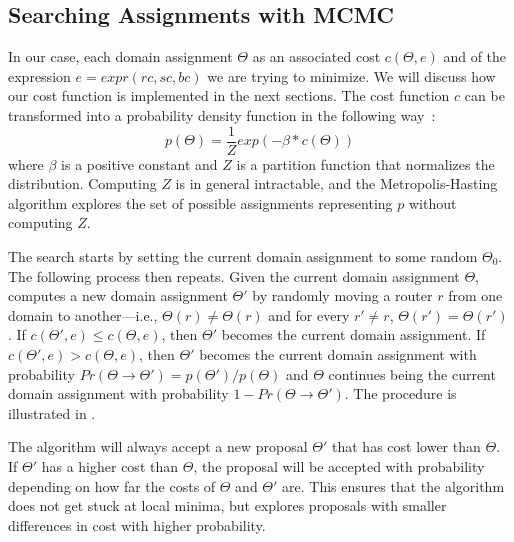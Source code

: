 \subsection{Searching Assignments with MCMC}

In our case, each domain assignment $\Theta$
as an associated cost $c(\Theta, e)$
and of the expression 
$e=expr(rc, sc, bc)$
we are trying to minimize.
We will discuss how our cost function is implemented in the next sections.
The cost function $c$ can be transformed 
into a probability density function in the following way~\cite{mcmcbook}:
\begin{equation}
	p(\Theta) = \frac{1}{Z}exp(-\beta * c(\Theta))
\end{equation}
where $\beta$ is a positive constant and $Z$ is a partition function  that
normalizes the distribution. Computing $Z$ is in general 
intractable, and the Metropolis-Hasting algorithm 
explores the set of possible assignments representing $p$ without computing $Z$. 

The search starts by setting the current domain assignment 
to some random $\Theta_0$.
The following process then repeats.
Given the current domain
assignment $\Theta$, 
computes a new domain assignment $\Theta'$ by randomly
moving a router $r$ from one domain to another---i.e., $\Theta(r)\neq \Theta(r)$ and
for every $r'\neq r$, $\Theta(r')= \Theta(r')$.
If $c(\Theta',e)\leq c(\Theta,e)$, then $\Theta'$ becomes the current domain assignment.
If $c(\Theta',e)>c(\Theta,e)$, then $\Theta'$ becomes the current domain assignment
with probability $Pr(\Theta \rightarrow \Theta')=p(\Theta')/p(\Theta)$ and 
 $\Theta$ continues being the current domain assignment with probability $1-Pr(\Theta \rightarrow \Theta')$.
The procedure is illustrated in .

The algorithm will always accept a new proposal $\Theta'$
that has cost lower than $\Theta$. If $\Theta'$ has a 
higher cost than $\Theta$, the proposal will be 
accepted with probability depending on 
how far the costs of $\Theta$ and $\Theta'$ are. This ensures that 
the algorithm does not get stuck at local minima, but 
explores proposals with smaller differences in cost with 
higher probability.



